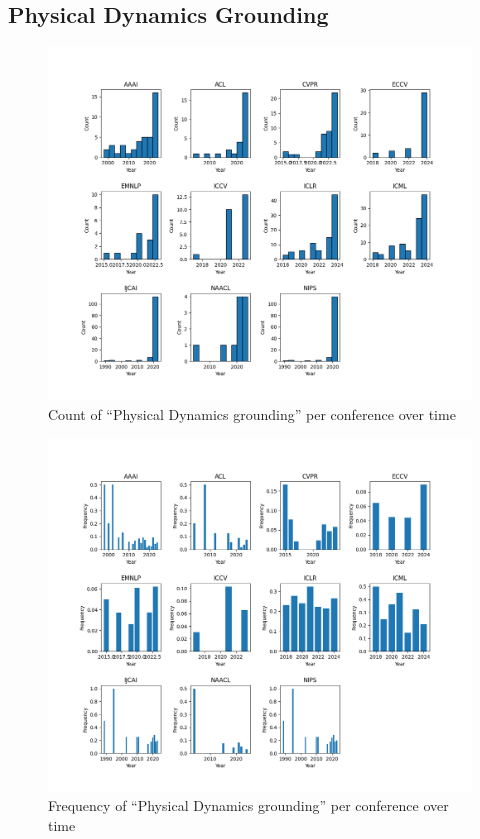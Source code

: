 \documentclass[11pt]{article}
\begin{document}
\subsection{Physical Dynamics Grounding}
\label{sec:appendix_word_sense_years_dynamics}
\begin{figure}[H]
  \includegraphics[width=0.75\columnwidth]{figs/grounding_figs/Physical Dynamics/split_by_conf_grounding_dist.png}
  \centering
  \caption{Count of ``Physical Dynamics grounding'' per conference over time}
  \label{fig:appendix_dynamics_all_confs_count}
\end{figure}

\begin{figure}[H]
  \includegraphics[width=0.75\columnwidth]{figs/freq_grounding_figs/Physical Dynamics/split_by_conf_grounding_dist.png}
  \centering
  \caption{Frequency of ``Physical Dynamics grounding'' per conference over time}
  \label{fig:appendix_dynamics_all_confs_freq}
\end{figure}
\end{document}
